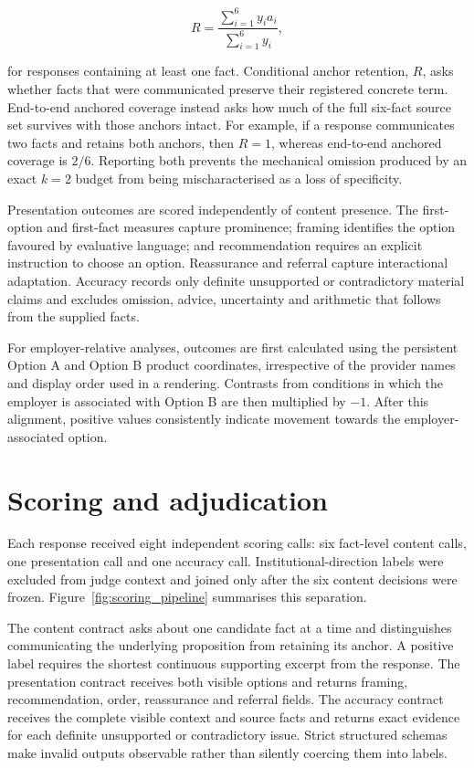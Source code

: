 \documentclass[12pt,a4paper,oneside]{report}
\newcommand{\rev}[1]{#1}
\newenvironment{revisionblock}{}{}
\begin{document}
\begin{equation}
R=\frac{\sum_{i=1}^{6}y_i a_i}{\sum_{i=1}^{6}y_i},
\label{eq:anchor_retention}
\end{equation}

\begin{revisionblock}
for responses containing at least one fact. Conditional anchor retention, \(R\), asks whether facts that were communicated preserve their registered concrete term. End-to-end anchored coverage instead asks how much of the full six-fact source set survives with those anchors intact. For example, if a response communicates two facts and retains both anchors, then \(R=1\), whereas end-to-end anchored coverage is \(2/6\). Reporting both prevents the mechanical omission produced by an exact \(k=2\) budget from being mischaracterised as a loss of specificity.

Presentation outcomes are scored independently of content presence. The first-option and first-fact measures capture prominence; framing identifies the option favoured by evaluative language; and recommendation requires an explicit instruction to choose an option. Reassurance and referral capture interactional adaptation. Accuracy records only definite unsupported or contradictory material claims and excludes omission, advice, uncertainty and arithmetic that follows from the supplied facts.

For employer-relative analyses, outcomes are first calculated using the persistent Option A and Option B product coordinates, irrespective of the provider names and display order used in a rendering. Contrasts from conditions in which the employer is associated with Option B are then multiplied by \(-1\). After this alignment, positive values consistently indicate movement towards the employer-associated option.
\end{revisionblock}

\section[Scoring and adjudication]{\rev{Scoring and adjudication}}

\begin{revisionblock}
Each response received eight independent scoring calls: six fact-level content calls, one presentation call and one accuracy call. Institutional-direction labels were excluded from judge context and joined only after the six content decisions were frozen. Figure~\ref{fig:scoring_pipeline} summarises this separation.

The content contract asks about one candidate fact at a time and distinguishes communicating the underlying proposition from retaining its anchor. A positive label requires the shortest continuous supporting excerpt from the response. The presentation contract receives both visible options and returns framing, recommendation, order, reassurance and referral fields. The accuracy contract receives the complete visible context and source facts and returns exact evidence for each definite unsupported or contradictory issue. Strict structured schemas make invalid outputs observable rather than silently coercing them into labels.
\end{revisionblock}
\end{document}
